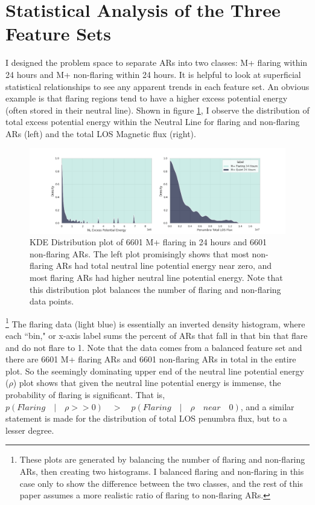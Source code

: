 \documentclass[defaultstyle,11pt]{thesis}
\begin{document}
\section{Statistical Analysis of the Three Feature Sets}
I designed the problem space to separate ARs into two classes: M+ flaring within 24 hours and M+ non-flaring within 24 hours. It is helpful to look at superficial statistical relationships to see any apparent trends in each feature set. An obvious example is that flaring regions tend to have a higher excess potential energy (often stored in their neutral line). Shown in figure \ref{fig:nlphi}, I observe the distribution of total excess potential energy within the Neutral Line for flaring and non-flaring ARs (left) and the total LOS Magnetic flux (right).
\begin{figure}[h]
    \centering
    \includegraphics[width=\linewidth]{ThesisFilePkg/figures/data/datasetanalysis.png}
    \caption{KDE Distribution plot of 6601 M+ flaring in 24 hours and 6601 non-flaring ARs. The left plot promisingly shows that most non-flaring ARs had total neutral line potential energy near zero, and most flaring ARs had higher neutral line potential energy. Note that this distribution plot balances the number of flaring and non-flaring data points.}
    \label{fig:nlphi}
\end{figure}
\footnote{These plots are generated by balancing the number of flaring and non-flaring ARs, then creating two histograms. I balanced flaring and non-flaring in this case only to show the difference between the two classes, and the rest of this paper assumes a more realistic ratio of flaring to non-flaring ARs.} The flaring data (light blue) is essentially an inverted density histogram, where each ``bin," or x-axis label sums the percent of ARs that fall in that bin that flare and do not flare to 1. Note that the data comes from a balanced feature set and there are 6601 M+ flaring ARs and 6601 non-flaring ARs in total in the entire plot. So the seemingly dominating upper end of the neutral line potential energy ($\rho$) plot shows that given the neutral line potential energy is immense, the probability of flaring is significant. That is, $p(Flaring \quad | \quad \rho >> 0) \quad > \quad p(Flaring \quad | \quad \rho \quad near \quad 0)$, and a similar statement is made for the distribution of total LOS penumbra flux, but to a lesser degree.
\end{document}
